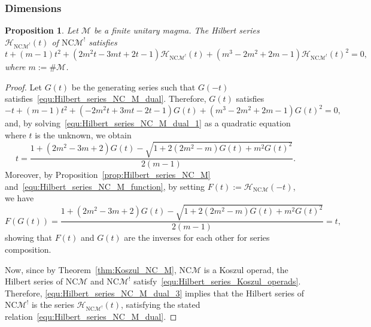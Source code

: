 \documentclass[10pt,reqno]{amsart}
\numberwithin{equation}{subsection}
\newtheorem{Proposition}[Theorem]{Proposition}
\newcommand{\Mca}{\mathcal{M}}
\newcommand{\NC}{\mathrm{NC}}
\newcommand{\Hilbert}{\mathcal{H}}
\begin{document}
\subsubsection{Dimensions}

\begin{Proposition} \label{prop:Hilbert_series_NC_M_dual}
    Let $\Mca$ be a finite unitary magma. The Hilbert series
    $\Hilbert_{\NC\Mca^!}(t)$ of $\NC\Mca^!$ satisfies
    \begin{equation} \label{equ:Hilbert_series_NC_M_dual}
        t + (m - 1)t^2
        + \left(2m^2t - 3mt + 2t -1\right)\Hilbert_{\NC\Mca^!}(t)
        + \left(m^3 - 2m^2 + 2m - 1\right)\Hilbert_{\NC\Mca^!}(t)^2 = 0,
    \end{equation}
    where $m := \# \Mca$.
\end{Proposition}
\begin{proof}
    Let $G(t)$ be the generating series such that $G(-t)$
    satisfies~\eqref{equ:Hilbert_series_NC_M_dual}. Therefore, $G(t)$
    satisfies
    \begin{equation} \label{equ:Hilbert_series_NC_M_dual_1}
        -t + (m - 1)t^2
        + \left(-2m^2t + 3mt - 2t -1\right)G(t)
        + \left(m^3 - 2m^2 + 2m - 1\right)G(t)^2 = 0,
    \end{equation}
    and, by solving~\eqref{equ:Hilbert_series_NC_M_dual_1} as a
    quadratic equation where $t$ is the unknown, we obtain
    \begin{equation} \label{equ:Hilbert_series_NC_M_dual_2}
        t =
        \frac{1 + (2m^2 - 3m + 2)G(t)
        - \sqrt{1 + 2(2m^2 - m)G(t)
        + m^2G(t)^2}}{2(m - 1)}.
    \end{equation}
    Moreover, by Proposition~\ref{prop:Hilbert_series_NC_M}
    and~\eqref{equ:Hilbert_series_NC_M_function}, by setting
    $F(t) := \Hilbert_{\NC\Mca}(-t)$, we have
    \begin{equation} \label{equ:Hilbert_series_NC_M_dual_3}
       F(G(t)) =
        \frac{1 + (2m^2 - 3m + 2)G(t)
        - \sqrt{1 + 2(2m^2 - m)G(t)
        + m^2G(t)^2}}{2(m - 1)}
        = t,
    \end{equation}
    showing that $F(t)$ and $G(t)$ are the inverses for each other for
    series composition.
    \smallskip

    Now, since by Theorem~\ref{thm:Koszul_NC_M}, $\NC\Mca$ is a Koszul
    operad, the Hilbert series of $\NC\Mca$ and $\NC\Mca^!$
    satisfy~\eqref{equ:Hilbert_series_Koszul_operads}. Therefore,
    \eqref{equ:Hilbert_series_NC_M_dual_3} implies that the Hilbert
    series of $\NC\Mca^!$ is the series $\Hilbert_{\NC\Mca^!}(t)$,
    satisfying the stated
    relation~\eqref{equ:Hilbert_series_NC_M_dual}.
\end{proof}
\medskip
\end{document}
